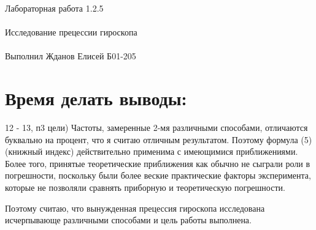 \documentclass{astroedu-lab}
\begin{document}
\begin{problem}{\huge Лабораторная работа 1.2.5\\\\Исследование прецессии гироскопа\\\\Выполнил Жданов Елисей Б01-205}
\section{Время делать выводы:}

12 - 13, п3 цели) Частоты, замеренные 2-мя различными способами, отличаются буквально на процент, что я считаю отличным результатом. Поэтому формула (5)(книжный индекс) действительно применима с имеющимися приближениями. Более того, принятые теоретические приближения как обычно не сыграли роли в погрешности, поскольку были более веские практические факторы эксперимента, которые не позволяли сравнять приборную и теоретическую погрешности.

Поэтому считаю, что вынужденная прецессия гироскопа исследована исчерпывающе различными способами и цель работы выполнена.

\end{problem}
\end{document}
